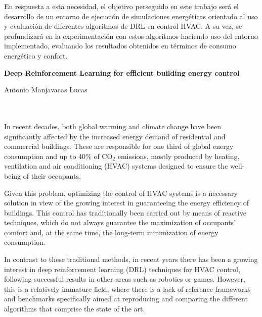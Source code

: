 En respuesta a esta necesidad, el objetivo perseguido en este trabajo será el desarrollo de un entorno de ejecución de simulaciones energéticas orientado al uso y evaluación de diferentes algoritmos de DRL en control HVAC. A su vez, se profundizará en la experimentación con estos algoritmos haciendo uso del entorno implementado, evaluando los resultados obtenidos en términos de consumo energético y confort.

\cleardoublepage
\thispagestyle{empty}

\begin{center}
{\large\bfseries Deep Reinforcement Learning for efficient building energy control}\\
\end{center}
\begin{center}
Antonio Manjavacas Lucas\\
\end{center}

\\

\vspace{0.7cm}
\\

In recent decades, both global warming and climate change have been significantly affected by the increased energy demand of residential and commercial buildings. These are responsible for one third of global energy consumption and up to 40\% of CO$_2$ emissions, mostly produced by heating, ventilation and air conditioning (HVAC) systems designed to ensure the well-being of their occupants.

Given this problem, optimizing the control of HVAC systems is a necessary solution in view of the growing interest in guaranteeing the energy efficiency of buildings. This control has traditionally been carried out by means of reactive techniques, which do not always guarantee the maximization of occupants' comfort and, at the same time, the long-term minimization of energy consumption.

In contrast to these traditional methods, in recent years there has been a growing interest in deep reinforcement learning (DRL) techniques for HVAC control, following successful results in other areas such as robotics or games. However, this is a relatively immature field, where there is a lack of reference frameworks and benchmarks specifically aimed at reproducing and comparing the different algorithms that comprise the state of the art.

